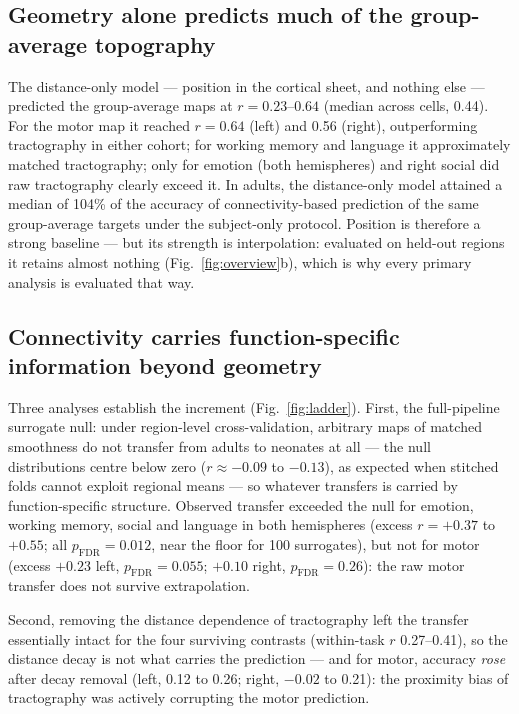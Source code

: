 \documentclass[11pt]{article}
\begin{document}
\subsection{Geometry alone predicts much of the group-average topography}

The distance-only model --- position in the cortical sheet, and nothing else
--- predicted the group-average maps at $r = 0.23$--$0.64$ (median across
cells, 0.44). For the motor map it reached $r = 0.64$ (left) and 0.56
(right), outperforming tractography in either cohort; for working memory and
language it approximately matched tractography; only for emotion (both
hemispheres) and right social did raw tractography clearly exceed it. In
adults, the distance-only model attained a median of 104\% of the accuracy
of connectivity-based prediction of the same group-average targets under
the subject-only protocol. Position is therefore a strong baseline --- but
its strength is interpolation: evaluated on held-out regions it retains
almost nothing (Fig.~\ref{fig:overview}b), which is why every primary
analysis is evaluated that way.

\subsection{Connectivity carries function-specific information beyond
geometry}

Three analyses establish the increment (Fig.~\ref{fig:ladder}). First, the
full-pipeline surrogate null: under region-level cross-validation, arbitrary
maps of matched smoothness do not transfer from adults to neonates at all
--- the null distributions centre below zero ($r \approx -0.09$ to $-0.13$),
as expected when stitched folds cannot exploit regional means --- so
whatever transfers is carried by function-specific structure. Observed
transfer exceeded the null for emotion, working memory, social and language
in both hemispheres (excess $r = +0.37$ to $+0.55$; all $p_{\mathrm{FDR}} =
0.012$, near the floor for 100 surrogates), but not for motor (excess
$+0.23$ left, $p_{\mathrm{FDR}} = 0.055$; $+0.10$ right, $p_{\mathrm{FDR}} =
0.26$): the raw motor transfer does not survive extrapolation.

Second, removing the distance dependence of tractography left the transfer
essentially intact for the four surviving contrasts (within-task $r$
0.27--0.41), so the distance decay is not what carries the prediction ---
and for motor, accuracy \emph{rose} after decay removal (left, 0.12 to 0.26;
right, $-0.02$ to 0.21): the proximity bias of tractography was actively
corrupting the motor prediction.
\end{document}
